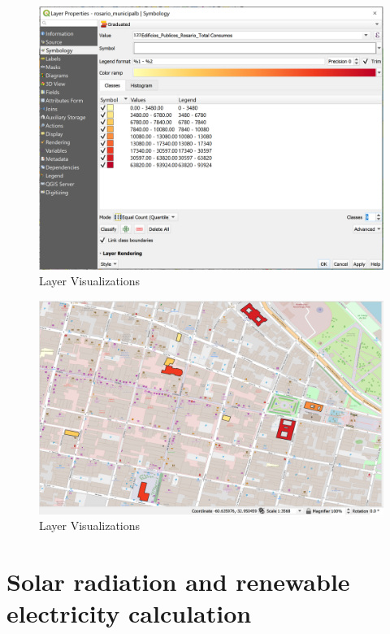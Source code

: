 \documentclass[
]{book}
\begin{document}
\begin{figure}

{\centering \includegraphics[width=1\linewidth]{images/symbology} 

}

\caption{Layer Visualizations}\label{fig:img-15}
\end{figure}
\begin{figure}

{\centering \includegraphics[width=1\linewidth]{images/symbology2} 

}

\caption{Layer Visualizations}\label{fig:img-16}
\end{figure}

\hypertarget{solar-radiation-and-renewable-electricity-calculation}{%
\chapter{Solar radiation and renewable electricity calculation}\label{solar-radiation-and-renewable-electricity-calculation}}
\end{document}
